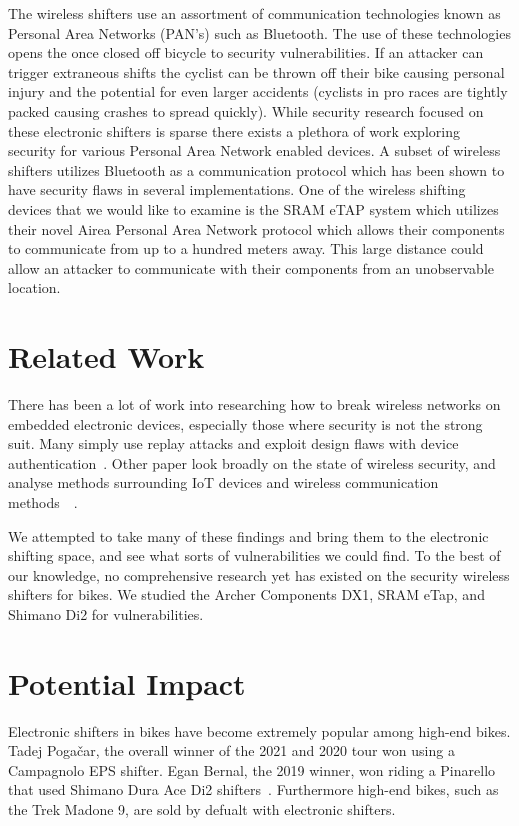 \documentclass[letterpaper,twocolumn,10pt]{article}
\begin{document}
The wireless shifters use an assortment of communication technologies known as Personal Area Networks (PAN’s) such as Bluetooth. The use of these technologies opens the once closed off bicycle to security vulnerabilities. If an attacker can trigger extraneous shifts the cyclist can be thrown off their bike causing personal injury and the potential for even larger accidents (cyclists in pro races are tightly packed causing crashes to spread quickly). While security research focused on these electronic shifters is sparse there exists a plethora of work exploring security for various Personal Area Network enabled devices. A subset of wireless shifters utilizes Bluetooth as a communication protocol which has been shown to have security flaws in several implementations. One of the wireless shifting devices that we would like to examine is the SRAM eTAP system which utilizes their novel Airea Personal Area Network protocol which allows their components to communicate from up to a hundred meters away. This large distance could allow an attacker to communicate with their components from an unobservable location.

\section{Related Work}

There has been a lot of work into researching how to break wireless networks on embedded electronic devices, especially those where security is not the strong suit. Many simply use replay attacks and exploit design flaws with device authentication~\cite{Halperin}. Other paper look broadly on the state of wireless security, and analyse methods surrounding IoT devices and wireless communication methods~\cite{Choi}~\cite{Radek}.

We attempted to take many of these findings and bring them to the electronic shifting space, and see what sorts of vulnerabilities we could find. To the best of our knowledge, no comprehensive research yet has existed on the security wireless shifters for bikes. We studied the Archer Components DX1, SRAM eTap, and Shimano Di2 for vulnerabilities.

\section{Potential Impact}

Electronic shifters in bikes have become extremely popular among high-end bikes. Tadej Pogačar, the overall winner of the 2021 and 2020 tour won using a Campagnolo EPS shifter. Egan Bernal, the 2019 winner, won riding a Pinarello that used Shimano Dura Ace Di2 shifters~\cite{GCNTech}. Furthermore high-end bikes, such as the Trek Madone 9, are sold by defualt with electronic shifters.
\end{document}
